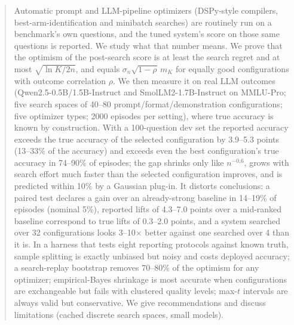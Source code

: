 \begin{abstract}
Automatic prompt and LLM-pipeline optimizers (DSPy-style compilers, best-arm-identification and minibatch searches) are routinely run on a benchmark's own questions, and the tuned system's score on those same questions is reported. We study what that number means. We prove that the optimism of the post-search score is at least the search regret and at most $\sqrt{\ln K/2n}$, and equals $\sigma_n\sqrt{1-\rho}\,m_K$ for equally good configurations with outcome correlation $\rho$. We then measure it on real LLM outcomes (Qwen2.5-0.5B/1.5B-Instruct and SmolLM2-1.7B-Instruct on MMLU-Pro; five search spaces of 40--80 prompt/format/demonstration configurations; five optimizer types; 2000 episodes per setting), where true accuracy is known by construction. With a 100-question dev set the reported accuracy exceeds the true accuracy of the selected configuration by 3.9--5.3 points (13--33\% of the accuracy) and exceeds even the best configuration's true accuracy in 74--90\% of episodes; the gap shrinks only like $n^{-0.6}$, grows with search effort much faster than the selected configuration improves, and is predicted within 10\% by a Gaussian plug-in. It distorts conclusions: a paired test declares a gain over an already-strong baseline in 14--19\% of episodes (nominal 5\%), reported lifts of 4.3--7.0 points over a mid-ranked baseline correspond to true lifts of 0.3--2.0 points, and a system searched over 32 configurations looks 3--10$\times$ better against one searched over 4 than it is. In a harness that tests eight reporting protocols against known truth, sample splitting is exactly unbiased but noisy and costs deployed accuracy; a search-replay bootstrap removes 70--80\% of the optimism for any optimizer; empirical-Bayes shrinkage is most accurate when configurations are exchangeable but fails with clustered quality levels; max-$t$ intervals are always valid but conservative. We give recommendations and discuss limitations (cached discrete search spaces, small models).
\end{abstract}
